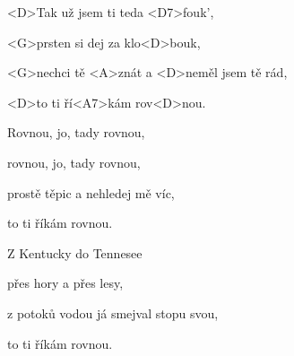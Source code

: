 

\zs
<D>Tak už jsem ti teda <D7>fouk',

<G>prsten si dej za klo<D>bouk,

<G>nechci tě <A>znát a <D>neměl jsem tě rád,

<D>to ti ří<A7>kám rov<D>nou.
\ks

\zr
Rovnou, jo, tady rovnou,

rovnou, jo, tady rovnou,

prostě těpic a nehledej mě víc,

to ti říkám rovnou.
\kr

\zs
Z Kentucky do Tennesee

přes hory a přes lesy,

z potoků vodou já smejval stopu svou,

to ti říkám rovnou.
\ks

\zr
\kr

\kp







